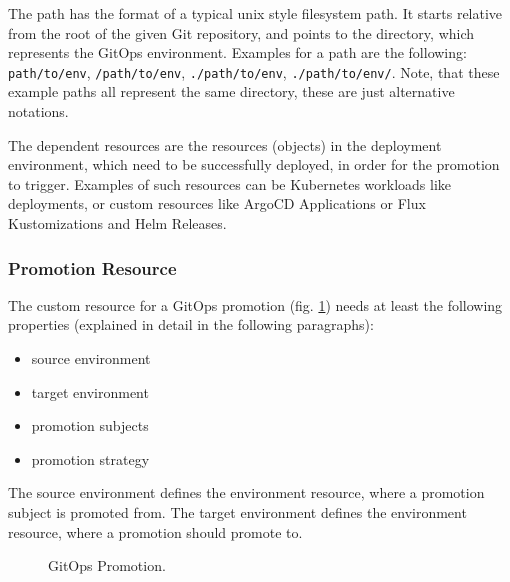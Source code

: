 The path has the format of a typical unix style filesystem path.
It starts relative from the root of the given Git repository,
and points to the directory, which represents the GitOps environment.
Examples for a path are the following:
\lstinline|path/to/env|,
\lstinline|/path/to/env|,
\lstinline|./path/to/env|,
\lstinline|./path/to/env/|.
Note, that these example paths all represent the same directory,
these are just alternative notations.

The dependent resources are the resources (objects) in the deployment environment,
which need to be successfully deployed, in order for the promotion to trigger.
Examples of such resources can be Kubernetes workloads like deployments,
or custom resources like ArgoCD Applications or Flux Kustomizations and Helm Releases.

\subsubsection*{Promotion Resource}

The custom resource for a GitOps promotion
(fig. \ref{fig:gitops-promo})
needs at least the following properties (explained in detail in the following paragraphs):

\begin{itemize}
	\item source environment
	\item target environment
	\item promotion subjects
	\item promotion strategy
\end{itemize}

The source environment defines the environment resource,
where a promotion subject is promoted from.
The target environment defines the environment resource,
where a promotion should promote to.

\begin{figure}[h]
	\centering
	\caption{GitOps Promotion.
	}
	\label{fig:gitops-promo}	
\end{figure}

